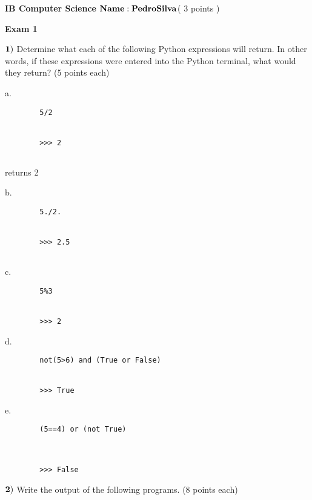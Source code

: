 \documentclass{article}
\begin{document}

\doublespacing
\textbf{IB Computer Science }                        %
 \hfill                             %
$ {\bf Name: Pedro  Silva } $( 3 points )

\begin{centering}
\vspace{1cm}
\textbf{Exam 1}\\
\end{centering}
\vspace{1cm}
 
$\bf{1)}$ Determine what each of the following Python expressions will return.  In other words, if these expressions were entered into the Python terminal, what would they return?
(5 points each)

\vspace{1cm}
  
 a.  
 \begin{verbatim}
 		5/2
		
		
		>>> 2
		
 \end{verbatim}
returns 2
 
 b.   \begin{verbatim}
 		5./2.
		
		
		>>> 2.5
		
 \end{verbatim}
  \vspace{1cm}
 
 c.  
  \begin{verbatim}
 		5%3
		
		
		>>> 2
 \end{verbatim}
 \vspace{1cm}
  
 d. 
  \begin{verbatim}
 		not(5>6) and (True or False) 
		
		
		>>> True
 \end{verbatim}
 \vspace{1cm}
 
 e. 
  \begin{verbatim}
 		(5==4) or (not True) 
		
		
		
		>>> False
 \end{verbatim}
 \vspace{1cm}

  \newpage
  
 $\bf{2)}$ Write the output of the following programs. (8 points each)
 
\end{document}
